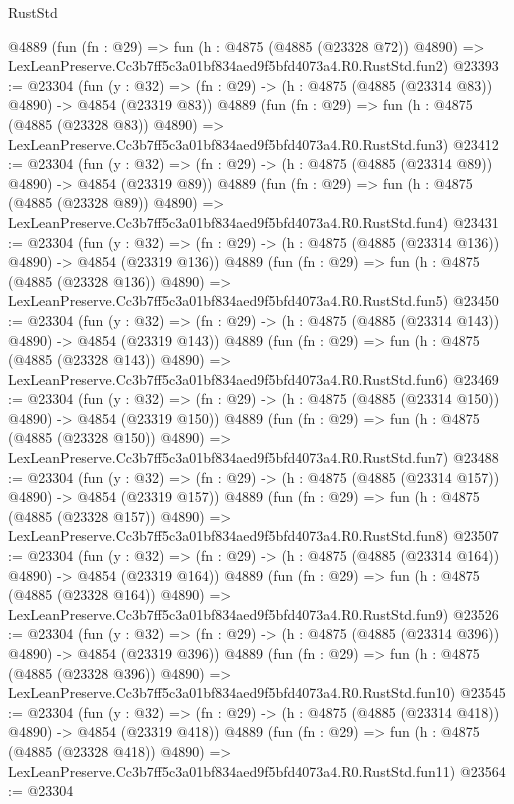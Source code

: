 \begin{lexlean}{RustStd}
\begin{coremodule}
    @4889
    (fun (fn : @29) =>
    fun (h : @4875 (@4885 (@23328 @72)) @4890) =>
    LexLeanPreserve.Cc3b7ff5c3a01bf834aed9f5bfd4073a4.R0.RustStd.fun2)
@23393 := @23304
    (fun (y : @32) => (fn : @29) -> (h : @4875 (@4885 (@23314 @83)) @4890) -> @4854 (@23319 @83))
    @4889
    (fun (fn : @29) =>
    fun (h : @4875 (@4885 (@23328 @83)) @4890) =>
    LexLeanPreserve.Cc3b7ff5c3a01bf834aed9f5bfd4073a4.R0.RustStd.fun3)
@23412 := @23304
    (fun (y : @32) => (fn : @29) -> (h : @4875 (@4885 (@23314 @89)) @4890) -> @4854 (@23319 @89))
    @4889
    (fun (fn : @29) =>
    fun (h : @4875 (@4885 (@23328 @89)) @4890) =>
    LexLeanPreserve.Cc3b7ff5c3a01bf834aed9f5bfd4073a4.R0.RustStd.fun4)
@23431 := @23304
    (fun (y : @32) => (fn : @29) -> (h : @4875 (@4885 (@23314 @136)) @4890) -> @4854 (@23319 @136))
    @4889
    (fun (fn : @29) =>
    fun (h : @4875 (@4885 (@23328 @136)) @4890) =>
    LexLeanPreserve.Cc3b7ff5c3a01bf834aed9f5bfd4073a4.R0.RustStd.fun5)
@23450 := @23304
    (fun (y : @32) => (fn : @29) -> (h : @4875 (@4885 (@23314 @143)) @4890) -> @4854 (@23319 @143))
    @4889
    (fun (fn : @29) =>
    fun (h : @4875 (@4885 (@23328 @143)) @4890) =>
    LexLeanPreserve.Cc3b7ff5c3a01bf834aed9f5bfd4073a4.R0.RustStd.fun6)
@23469 := @23304
    (fun (y : @32) => (fn : @29) -> (h : @4875 (@4885 (@23314 @150)) @4890) -> @4854 (@23319 @150))
    @4889
    (fun (fn : @29) =>
    fun (h : @4875 (@4885 (@23328 @150)) @4890) =>
    LexLeanPreserve.Cc3b7ff5c3a01bf834aed9f5bfd4073a4.R0.RustStd.fun7)
@23488 := @23304
    (fun (y : @32) => (fn : @29) -> (h : @4875 (@4885 (@23314 @157)) @4890) -> @4854 (@23319 @157))
    @4889
    (fun (fn : @29) =>
    fun (h : @4875 (@4885 (@23328 @157)) @4890) =>
    LexLeanPreserve.Cc3b7ff5c3a01bf834aed9f5bfd4073a4.R0.RustStd.fun8)
@23507 := @23304
    (fun (y : @32) => (fn : @29) -> (h : @4875 (@4885 (@23314 @164)) @4890) -> @4854 (@23319 @164))
    @4889
    (fun (fn : @29) =>
    fun (h : @4875 (@4885 (@23328 @164)) @4890) =>
    LexLeanPreserve.Cc3b7ff5c3a01bf834aed9f5bfd4073a4.R0.RustStd.fun9)
@23526 := @23304
    (fun (y : @32) => (fn : @29) -> (h : @4875 (@4885 (@23314 @396)) @4890) -> @4854 (@23319 @396))
    @4889
    (fun (fn : @29) =>
    fun (h : @4875 (@4885 (@23328 @396)) @4890) =>
    LexLeanPreserve.Cc3b7ff5c3a01bf834aed9f5bfd4073a4.R0.RustStd.fun10)
@23545 := @23304
    (fun (y : @32) => (fn : @29) -> (h : @4875 (@4885 (@23314 @418)) @4890) -> @4854 (@23319 @418))
    @4889
    (fun (fn : @29) =>
    fun (h : @4875 (@4885 (@23328 @418)) @4890) =>
    LexLeanPreserve.Cc3b7ff5c3a01bf834aed9f5bfd4073a4.R0.RustStd.fun11)
@23564 := @23304

\end{coremodule}
\end{lexlean}
